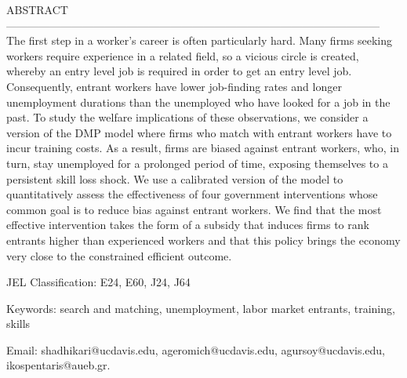 \documentclass[12pt]{article} %
\theoremstyle{definition}
\begin{document}
\noindent ABSTRACT------------------------------------------------------------------------------------------------------
\noindent The first step in a worker's career is often particularly hard. Many firms seeking workers require experience in a related field, so a vicious circle is created, whereby an entry level job is required in order to get an entry level job. Consequently, entrant workers have lower job-finding rates and longer unemployment durations than the unemployed who have looked for a job in the past. To study the welfare implications of these observations, we consider a version of the DMP model where firms who match with entrant workers have to incur training costs. As a result, firms are biased against entrant workers, who, in turn, stay unemployed for a prolonged period of time, exposing themselves to a persistent skill loss shock. 
We use a calibrated version of the model to quantitatively assess the effectiveness of four government interventions whose common goal is to reduce bias against entrant workers. 
We find that the most effective intervention takes the form of a subsidy that induces firms to rank entrants higher than experienced workers and that this policy brings the economy very close to the constrained efficient outcome.


\vspace{0.4cm}


\noindent JEL Classification: E24, E60, J24, J64

\noindent Keywords: search and matching, unemployment, labor market entrants, training, skills


\vspace{0.6cm}

\noindent \footnotesize Email: shadhikari@ucdavis.edu, ageromich@ucdavis.edu, agursoy@ucdavis.edu, ikospentaris@aueb.gr.


\thispagestyle{empty}

\vspace{0.6cm}
\end{document}
